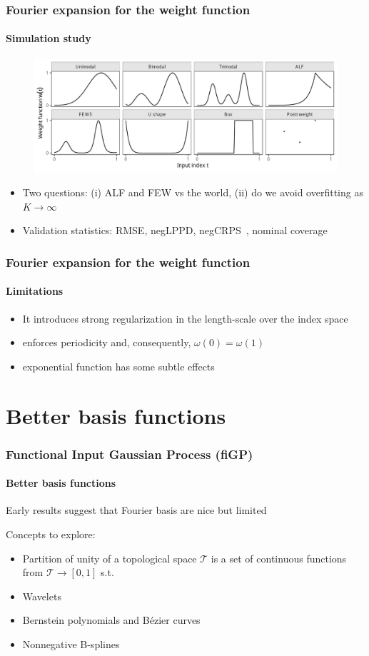 \documentclass{snedecorbeamer}
\begin{document}
\begin{frame}
  \frametitle{Fourier expansion for the weight function}
  \framesubtitle{Simulation study}

  \begin{figure}
    \centering
    \includegraphics[width=1\textwidth]{syn01-weight-true}
  \end{figure}

  \begin{itemize}
  \item Two questions: (i) ALF and FEW vs the world, (ii) do we avoid
    overfitting as $K\to\infty$
  \item Validation statistics: RMSE, negLPPD, negCRPS~\citep{gneiting2007},
    nominal coverage
  \end{itemize}
\end{frame}

\begin{frame}
  \frametitle{Fourier expansion for the weight function}
  \framesubtitle{Limitations}

  \begin{itemize}
  \item It introduces strong regularization in the length-scale over the index
    space
  \item enforces periodicity and, consequently, $\omega(0) = \omega(1)$
  \item exponential function has some subtle effects
  \end{itemize}

\end{frame}

\section{Better basis functions}

\begin{frame}
  \frametitle{Functional Input Gaussian Process (fiGP)}
  \framesubtitle{Better basis functions}
  Early results suggest that Fourier basis are nice but limited

  Concepts to explore:
  \begin{itemize}
  \item Partition of unity of a topological space $\mathcal{T}$ is a set of
    continuous functions from $\mathcal{T}\to[0, 1]$ s.t.
  \item Wavelets
  \item Bernstein polynomials and Bézier curves
  \item Nonnegative B-splines
  \end{itemize}
\end{frame}
\end{document}
